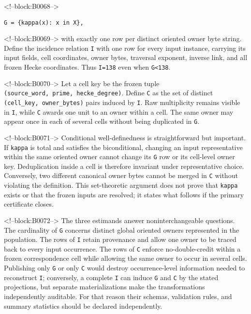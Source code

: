 \documentclass[11pt]{article}
\begin{document}
<!--block:B0068-->
\begin{verbatim}
G = {kappa(x): x in X},
\end{verbatim}

<!--block:B0069-->
with exactly one row per distinct oriented owner byte string. Define the
incidence relation \texttt{I} with one row for every input instance,
carrying its input fields, cell coordinates, owner bytes, traversal
exponent, inverse link, and all frozen Hecke coordinates. Thus
\texttt{\textbar{}I\textbar{}=138} even when
\texttt{\textbar{}G\textbar{}\textless{}138}.

<!--block:B0070-->
Let a cell key be the frozen tuple
\texttt{(source\_word,\ prime,\ hecke\_degree)}. Define \texttt{C} as
the set of distinct \texttt{(cell\_key,\ owner\_bytes)} pairs induced by
\texttt{I}. Raw multiplicity remains visible in \texttt{I}, while
\texttt{C} awards one unit to an owner within a cell. The same owner may
appear once in each of several cells without being duplicated in
\texttt{G}.

<!--block:B0071-->
Conditional well-definedness is straightforward but important. If
\texttt{kappa} is total and satisfies the biconditional, changing an
input representative within the same oriented owner cannot change its
\texttt{G} row or its cell-level owner key. Deduplication inside a cell
is therefore invariant under representative choice. Conversely, two
different canonical owner bytes cannot be merged in \texttt{C} without
violating the definition. This set-theoretic argument does not prove
that \texttt{kappa} exists or that the frozen inputs are resolved; it
states what follows if the primary certificate closes.

<!--block:B0072-->
The three estimands answer noninterchangeable questions. The cardinality
of \texttt{G} concerns distinct global oriented owners represented in
the population. The rows of \texttt{I} retain provenance and allow one
owner to be traced back to every input occurrence. The rows of
\texttt{C} enforce no-double-credit within a frozen correspondence cell
while allowing the same owner to occur in several cells. Publishing only
\texttt{G} or only \texttt{C} would destroy occurrence-level information
needed to reconstruct \texttt{I}; conversely, a complete \texttt{I} can
induce \texttt{G} and \texttt{C} by the stated projections, but separate
materializations make the transformations independently auditable. For
that reason their schemas, validation rules, and summary statistics
should be declared independently.
\end{document}
